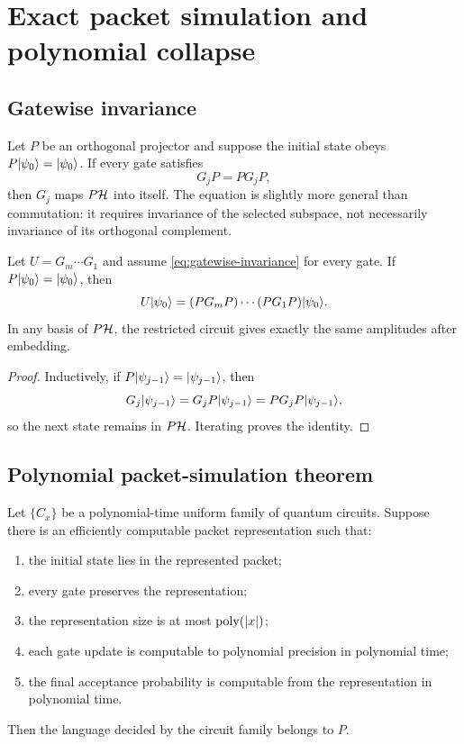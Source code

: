 \chapter{Exact packet simulation and polynomial collapse}
\label{ch:exact-simulation}

\section{Gatewise invariance}
Let $P$ be an orthogonal projector and suppose the initial state obeys $P\lvert \psi_0\rangle=\lvert \psi_0\rangle$. If every gate satisfies
\begin{equation}
G_jP=PG_jP,
\label{eq:gatewise-invariance}
\end{equation}
then $G_j$ maps $P\mathcal H$ into itself. The equation is slightly more general than commutation: it requires invariance of the selected subspace, not necessarily invariance of its orthogonal complement.

\begin{theorem}
\label{thm:invariant-basis}
Let $U=G_m\cdots G_1$ and assume \cref{eq:gatewise-invariance} for every gate. If $P\lvert \psi_0\rangle=\lvert \psi_0\rangle$, then
\[
U\lvert \psi_0\rangle
=
(PG_mP)\cdots(PG_1P)\lvert \psi_0\rangle.
\]
In any basis of $P\mathcal H$, the restricted circuit gives exactly the same amplitudes after embedding.
\end{theorem}

\begin{proof}
Inductively, if $P\lvert \psi_{j-1}\rangle=\lvert \psi_{j-1}\rangle$, then
\[
G_j\lvert \psi_{j-1}\rangle
=
G_jP\lvert \psi_{j-1}\rangle
=
PG_jP\lvert \psi_{j-1}\rangle,
\]
so the next state remains in $P\mathcal H$. Iterating proves the identity.
\end{proof}

\section{Polynomial packet-simulation theorem}
\begin{theorem}
\label{thm:poly-packet}
Let $\{C_x\}$ be a polynomial-time uniform family of quantum circuits. Suppose there is an efficiently computable packet representation such that:

\begin{enumerate}
\item the initial state lies in the represented packet;
\item every gate preserves the representation;
\item the representation size is at most $\operatorname{poly}(|x|)$;
\item each gate update is computable to polynomial precision in polynomial time;
\item the final acceptance probability is computable from the representation in polynomial time.
\end{enumerate}

Then the language decided by the circuit family belongs to $P$.
\end{theorem}

